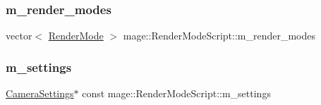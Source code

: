\subsubsection{\texorpdfstring{m\+\_\+render\+\_\+modes}{m\_render\_modes}}
{\footnotesize\ttfamily vector$<$ \hyperlink{namespacemage_a5e7e18b0154373ce8fc942fe3f6b27fd}{Render\+Mode} $>$ mage\+::\+Render\+Mode\+Script\+::m\+\_\+render\+\_\+modes\hspace{0.3cm}{\ttfamily [private]}}

\hypertarget{classmage_1_1_render_mode_script_a536b13e61daa6faa3528f65d29fb252f}{}\label{classmage_1_1_render_mode_script_a536b13e61daa6faa3528f65d29fb252f} 
\subsubsection{\texorpdfstring{m\+\_\+settings}{m\_settings}}
{\footnotesize\ttfamily \hyperlink{structmage_1_1_camera_settings}{Camera\+Settings}$\ast$ const mage\+::\+Render\+Mode\+Script\+::m\+\_\+settings\hspace{0.3cm}{\ttfamily [private]}}

